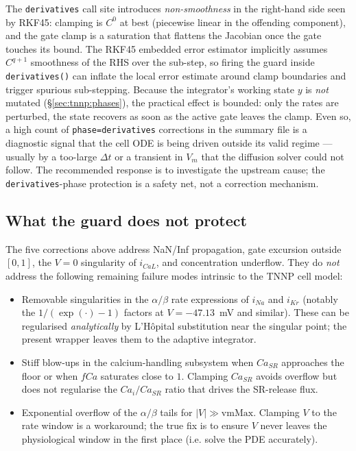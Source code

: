 \documentclass[11pt,a4paper]{article}
\newcommand{\Vm}{V_{m}}
\newcommand{\code}[1]{\texttt{\small #1}}
\begin{document}
The \code{derivatives} call site introduces \emph{non-smoothness} in
the right-hand side seen by RKF45: clamping is $C^{0}$ at best
(piecewise linear in the offending component), and the gate clamp is
a saturation that flattens the Jacobian once the gate touches its
bound. The RKF45 embedded error estimator implicitly assumes
$C^{q+1}$ smoothness of the RHS over the sub-step, so firing the
guard inside \code{derivatives()} can inflate the local error
estimate around clamp boundaries and trigger spurious sub-stepping.
Because the integrator's working state $y$ is \emph{not} mutated
(\S\ref{sec:tnnp:phases}), the practical effect is bounded: only the
rates are perturbed, the state recovers as soon as the active gate
leaves the clamp. Even so, a high count of \code{phase=derivatives}
corrections in the summary file is a diagnostic signal that the cell
ODE is being driven outside its valid regime — usually by a too-large
$\Delta t$ or a transient in $\Vm$ that the diffusion solver could not
follow. The recommended response is to investigate the upstream
cause; the \code{derivatives}-phase protection is a safety net, not a
correction mechanism.

\subsection{What the guard does not protect}
\label{sec:tnnp:notProtected}

The five corrections above address NaN/Inf propagation, gate excursion
outside $[0,1]$, the $V=0$ singularity of $i_{CaL}$, and concentration
underflow. They do \emph{not} address the following remaining failure
modes intrinsic to the TNNP cell model:

\begin{itemize}[leftmargin=*]
\item Removable singularities in the $\alpha/\beta$ rate expressions
of $i_{Na}$ and $i_{Kr}$ (notably the $1/(\exp(\cdot)-1)$ factors at
$V = -47.13$~mV and similar). These can be regularised
\emph{analytically} by L'H\^opital substitution near the singular
point; the present wrapper leaves them to the adaptive integrator.
\item Stiff blow-ups in the calcium-handling subsystem when $Ca_{SR}$
approaches the floor or when $fCa$ saturates close to $1$. Clamping
$Ca_{SR}$ avoids overflow but does not regularise the
$Ca_{i}/Ca_{SR}$ ratio that drives the SR-release flux.
\item Exponential overflow of the $\alpha/\beta$ tails for $|V| \gg
\text{vmMax}$. Clamping $V$ to the rate window is a workaround; the
true fix is to ensure $V$ never leaves the physiological window in
the first place (i.e. solve the PDE accurately).
\end{itemize}
\end{document}
